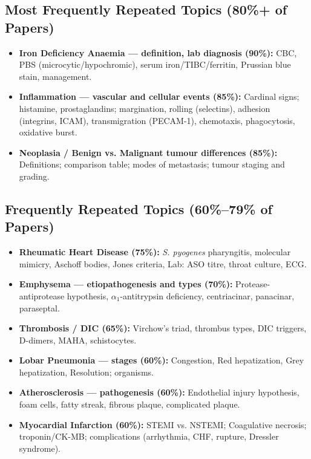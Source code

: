 \documentclass[11pt,a4paper]{article}
\begin{document}
\subsection{Most Frequently Repeated Topics (80\%+ of Papers)}
\begin{itemize}[leftmargin=*]
    \item \textbf{Iron Deficiency Anaemia --- definition, lab diagnosis (90\%):} CBC, PBS (microcytic/hypochromic), serum iron/TIBC/ferritin, Prussian blue stain, management.
    \item \textbf{Inflammation --- vascular and cellular events (85\%):} Cardinal signs; histamine, prostaglandins; margination, rolling (selectins), adhesion (integrins, ICAM), transmigration (PECAM-1), chemotaxis, phagocytosis, oxidative burst.
    \item \textbf{Neoplasia / Benign vs. Malignant tumour differences (85\%):} Definitions; comparison table; modes of metastasis; tumour staging and grading.
\end{itemize}

\subsection{Frequently Repeated Topics (60\%--79\% of Papers)}
\begin{itemize}[leftmargin=*]
    \item \textbf{Rheumatic Heart Disease (75\%):} \textit{S. pyogenes} pharyngitis, molecular mimicry, Aschoff bodies, Jones criteria, Lab: ASO titre, throat culture, ECG.
    \item \textbf{Emphysema --- etiopathogenesis and types (70\%):} Protease-antiprotease hypothesis, $\alpha_1$-antitrypsin deficiency, centriacinar, panacinar, paraseptal.
    \item \textbf{Thrombosis / DIC (65\%):} Virchow's triad, thrombus types, DIC triggers, D-dimers, MAHA, schistocytes.
    \item \textbf{Lobar Pneumonia --- stages (60\%):} Congestion, Red hepatization, Grey hepatization, Resolution; organisms.
    \item \textbf{Atherosclerosis --- pathogenesis (60\%):} Endothelial injury hypothesis, foam cells, fatty streak, fibrous plaque, complicated plaque.
    \item \textbf{Myocardial Infarction (60\%):} STEMI vs. NSTEMI; Coagulative necrosis; troponin/CK-MB; complications (arrhythmia, CHF, rupture, Dressler syndrome).
\end{itemize}
\end{document}
